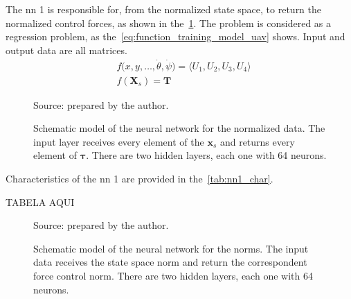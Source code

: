 The \gls*{nn} 1 is responsible for, from the normalized state space, to return the normalized control forces, as shown in the~\cref{fig:nn1_scheme}.
The problem is considered as a regression problem, as the~\cref{eq:function_training_model_uav} shows. Input and output data are all matrices.
%
\begin{subequations}\label{eq:function_training_model_uav}
    \begin{align}
        &f\big(x,y,\ldots,\dot{\theta},\dot{\psi}\big) = \langle U_1, U_2, U_3, U_4 \rangle \\
        &f(\mathbf{X}_s) = \mathbf{T}
    \end{align}
\end{subequations}

\begin{figure}[!htb]
    \centering
    \caption[Schematic model of the neural network for the normalized data]{Schematic model of the neural network for the normalized data. The input layer receives every element of the \(\mathbf{x}_s\) and returns every element of \(\mathbf{\tau}\). There are two hidden layers, each one with 64 neurons.}
    

    {\footnotesize Source: prepared by the author.}
    \label{fig:nn1_scheme}
\end{figure}

Characteristics of the \gls*{nn} 1 are provided in the~\cref{tab:nn1_char}.

\begin{table}[!htb]
    TABELA AQUI
    \label{tab:nn1_char}
\end{table}

\begin{figure}[!htb]
    \centering
    \caption[Schematic model of the neural network for the norms]{Schematic model of the neural network for the norms. The input data receives the state space norm and return the correspondent force control norm. There are two hidden layers, each one with 64 neurons.}
    

    {\footnotesize Source: prepared by the author.}
\end{figure}